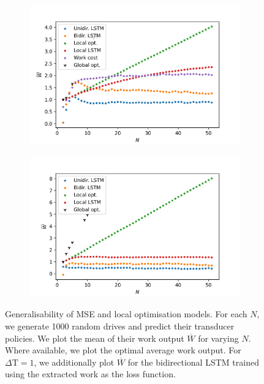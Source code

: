 \begin{figure}
	\centering
\begin{subfigure}{0.4\textwidth}
	\centering
	\includegraphics[width=\textwidth]{img/gen_dt_1}
\end{subfigure}
\begin{subfigure}{0.4\textwidth}
	\centering
	\includegraphics[width=\textwidth]{img/gen_dt_5}
\end{subfigure}
	\caption{Generalisability of MSE and local optimisation models. For each $N$, we generate 1000 random drives and predict their transducer policies. We plot the mean of their work output $\overline{W}$ for varying $N$. Where available, we plot the optimal average work output. For $\Delta \mathrm{T} = 1$, we additionally plot $\overline{W}$ for the bidirectional LSTM trained using the extracted work as the loss function.}
	\label{genplot}
\end{figure}